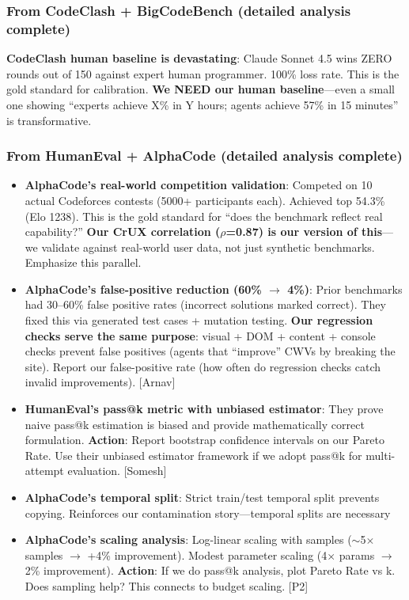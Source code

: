 \subsubsection{From CodeClash + BigCodeBench (detailed analysis complete)}
\textbf{CodeClash human baseline is devastating}: Claude Sonnet 4.5 wins ZERO rounds out of 150 against expert human programmer. 100\% loss rate. This is the gold standard for calibration. \textbf{We NEED our human baseline}---even a small one showing ``experts achieve X\% in Y hours; agents achieve 57\% in 15 minutes'' is transformative.

\subsubsection{From HumanEval + AlphaCode (detailed analysis complete)}
\begin{itemize}
    \item \textbf{AlphaCode's real-world competition validation}: Competed on 10 actual Codeforces contests (5000+ participants each). Achieved top 54.3\% (Elo 1238). This is the gold standard for ``does the benchmark reflect real capability?'' \textbf{Our CrUX correlation ($\rho$=0.87) is our version of this}---we validate against real-world user data, not just synthetic benchmarks. Emphasize this parallel.
    \item \textbf{AlphaCode's false-positive reduction (60\% $\rightarrow$ 4\%)}: Prior benchmarks had 30--60\% false positive rates (incorrect solutions marked correct). They fixed this via generated test cases + mutation testing. \textbf{Our regression checks serve the same purpose}: visual + DOM + content + console checks prevent false positives (agents that ``improve'' CWVs by breaking the site). Report our false-positive rate (how often do regression checks catch invalid improvements). [Arnav]
    \item \textbf{HumanEval's pass@k metric with unbiased estimator}: They prove naive pass@k estimation is biased and provide mathematically correct formulation. \textbf{Action}: Report bootstrap confidence intervals on our Pareto Rate. Use their unbiased estimator framework if we adopt pass@k for multi-attempt evaluation. [Somesh]
    \item \textbf{AlphaCode's temporal split}: Strict train/test temporal split prevents copying. Reinforces our contamination story---temporal splits are necessary
    \item \textbf{AlphaCode's scaling analysis}: Log-linear scaling with samples ($\sim$5$\times$ samples $\rightarrow$ +4\% improvement). Modest parameter scaling (4$\times$ params $\rightarrow$ 2\% improvement). \textbf{Action}: If we do pass@k analysis, plot Pareto Rate vs k. Does sampling help? This connects to budget scaling. [P2]

\end{itemize}
